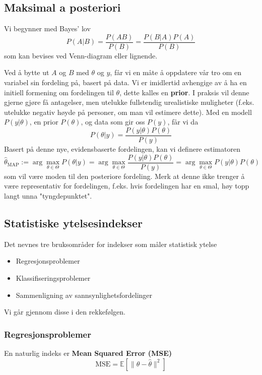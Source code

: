 \documentclass[12pt]{article}
\begin{document}
\subsection{Maksimal a posteriori}
Vi begynner med Bayes' lov
\begin{equation}
P(A | B)=\frac{P(A B)}{P(B)} = \frac{P(B | A) P(A)}{P(B)}
\end{equation}
som kan bevises ved Venn-diagram eller lignende.

Ved å bytte ut $A$ og $B$ med $\theta$ og $y$, får vi en måte å oppdatere vår tro om en variabel sin fordeling på, basert på data. Vi er imidlertid avhengige av å ha en initiell formening om fordelingen til $\theta$, dette kalles en \textbf{prior}. I praksis vil denne gjerne gjøre få antagelser, men utelukke fullstendig urealistiske muligheter (f.eks. utelukke negativ høyde på personer, om man vil estimere dette). Med en modell $P(y | \theta)$, en prior $P(\theta)$, og data som gir oss $P(y)$, får vi da
\begin{equation}
P(\theta | y)=\frac{P(y | \theta) P(\theta)}{P(y)}
\end{equation}
Basert på denne nye, evidensbaserte fordelingen, kan vi definere estimatoren
\begin{equation}
\widehat{\theta}_{\mathrm{MAP}}:=\arg \max _{\theta \in \Theta} P(\theta | y)=\arg \max _{\theta \in \Theta} \frac{P(y | \theta) P(\theta)}{P(y)}=\arg \max _{\theta \in \Theta} P(y | \theta) P(\theta)
\end{equation}
som vil være moden til den posteriore fordeling. Merk at denne ikke trenger å være representativ for fordelingen, f.eks. hvis fordelingen har en smal, høy topp langt unna "tyngdepunktet".

\subsection{Statistiske ytelsesindekser}
Det nevnes tre bruksområder for indekser som måler statistisk ytelse
\begin{itemize}
\item Regresjonsproblemer
\item Klassifiseringsproblemer
\item Sammenligning av sannsynlighetsfordelinger
\end{itemize}
Vi går gjennom disse i den rekkefølgen.

\subsubsection{Regresjonsproblemer}
En naturlig indeks er \textbf{Mean Squared Error (MSE)}
\begin{equation}
\textrm{MSE} = \mathbb{E}\left[\|\theta-\widehat{\theta}\|^{2}\right]
\end{equation}
\end{document}
